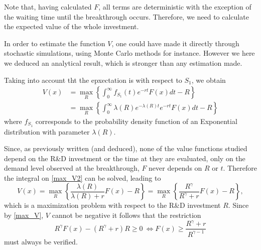Note that, having calculated $F$, all terms are deterministic with the exception of the waiting time until the breakthrough occurs. Therefore, we need to calculate the expected value of the whole investment.

In order to estimate the function $V$, one could have made it directly through stochastic simulations, using Monte Carlo methods for instance. However we here we deduced an analytical result, which is stronger than any estimation made.


Taking into account tht the epxectation is with respect to $S_1$, we obtain
\begin{align}
 V(x)&=\max_R  \left\{ \int_0 ^\infty f_{S_1}(t) e^{-rt} F(x) dt -R \right\} \nonumber \\
 &=\max_R  \left\{ \int_0 ^\infty \lambda(R) e^{-\lambda(R)t} e^{-rt} F(x) dt -R \right\} \label{max_V2}
\end{align}
where $f_{S_1}$ corresponds to the probability density function of an Exponential distribution with parameter $\lambda(R)$. %

Since, as previously written (and deduced), none of the value functions studied depend on the R\&D investment or the time at they are evaluated, only on the demand level observed at the breakthrough, $F$ never depends on $R$ or $t$. Therefore the integral on \eqref{max_V2} can be solved, leading to
\begin{equation}
V(x)=\max_R \left\{ \frac{\lambda(R)}{\lambda(R)+r} F(x) -R \right\}=\max_R \left\{ \frac{R^\gamma}{R^\gamma+r} F(x) -R \right\},
\label{max_V3}
\end{equation}
which is a maximization problem with respect to the R\&D investment $R$. Since by \eqref{max_V}, $V$ cannot be negative it follows that the restriction
\begin{equation}
R^\gamma F(x) - (R^\gamma+r)R \geq 0 \ \Leftrightarrow  F(x) \geq \frac{R^\gamma+r}{R^{\gamma-1}}
	\label{max_rest}
\end{equation}
must always be verified.

